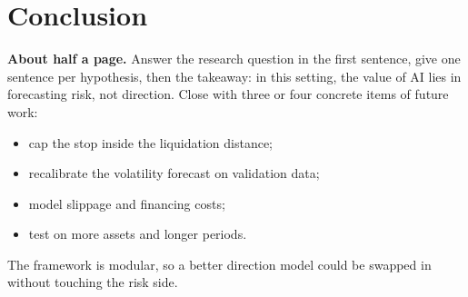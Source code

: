 \section{Conclusion}\label{sec:conclusion}

\begin{guide}
\textbf{About half a page.} Answer the research question in the first sentence, give one sentence per hypothesis, then the takeaway: in this setting, the value of AI lies in forecasting risk, not direction. Close with three or four concrete items of future work:
\begin{itemize}
  \item cap the stop inside the liquidation distance;
  \item recalibrate the volatility forecast on validation data;
  \item model slippage and financing costs;
  \item test on more assets and longer periods.
\end{itemize}
The framework is modular, so a better direction model could be swapped in without touching the risk side.
\end{guide}

\tbc{}
